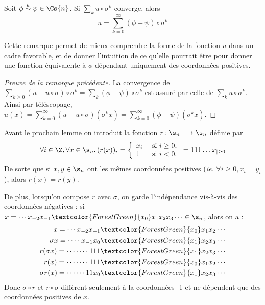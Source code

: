   \begin{remark}
    \label{rm:eq_if_equiv}
    Soit $\phi \overset{u}{\sim} \psi \in \Cs{n}$. Si $\sum_k{u\circ\sigma^k}$ converge,
    alors
    $$u = \sum_{k=0}^{\infty}{(\phi - \psi) \circ \sigma^k}$$

    Cette remarque permet de mieux comprendre la forme de la fonction $u$ dans un cadre favorable,
    et de donner l'intuition de ce qu'elle pourrait être pour donner une fonction équivalente à $\phi$ dépendant uniquement des coordonnées positives.
  \end{remark}

  \begin{proof}[Preuve de la remarque précédente]
    La convergence de $\sum_{k \geq 0}{(u - u\circ\sigma)\circ\sigma^k} = \sum_k{(\phi - \psi)\circ\sigma^k}$ est assuré
    par celle de $\sum_k{u\circ\sigma^k}$.
    Ainsi par téléscopage,
    $u(x) = \sum_{k=0}^{\infty}{(u - u \circ \sigma)(\sigma^k x)} = \sum_{k=0}^{\infty}{(\phi - \psi)(\sigma^k x)}$.
  \end{proof}

  Avant le prochain lemme on introduit la fonction $r \colon \s_n \longrightarrow \s_n$ définie par
  $$\forall i \in \Z, \forall x \in \s_n, (r(x))_i = \left\{
    \begin{array}{ll}
      x_i &\text{ si } i \geq 0, \\
      1   &\text{ si } i < 0.
    \end{array} \right. = 111\hdots x_{|\geq 0}$$
    De sorte que si $x, y \in \s_n$ ont les mêmes coordonnées positives (\textit{ie.} $\forall i \geq 0, x_i = y_i$), alors $r(x) = r(y)$.

    De plus, lorsqu'on compose $r$ avec $\sigma$, on garde l'indépendance vis-à-vis des coordonnées négatives :
    si $x = \cdots x_{-2}x_{-1}\textcolor{ForestGreen}{x_0} x_1 x_2 x_3\cdots \in \s_n$, alors on a :
    \begin{align*}
        x           = \cdots x_{-2}x_{-1}   &\textcolor{ForestGreen}{x_0} x_1 x_2\cdots \\
	\sigma x    = \cdots\cdot x_{-1}x_0 &\textcolor{ForestGreen}{x_1}x_2 x_3\cdots \\
	r(\sigma x) = \cdots\cdots\cdot 111 &\textcolor{ForestGreen}{x_1}x_2x_3\cdots \\
	r(x)	    = \cdots\cdots\cdot 111 &\textcolor{ForestGreen}{x_0}x_1 x_2\cdots \\
	\sigma r(x) = \cdots\cdots 11x_0    &\textcolor{ForestGreen}{x_1}x_2 x_3\cdots
    \end{align*}
    Donc $\sigma \circ r$ et $r \circ \sigma$ diffèrent seulement à la coordonnées -1 et ne dépendent que des coordonnées positives de $x$.

